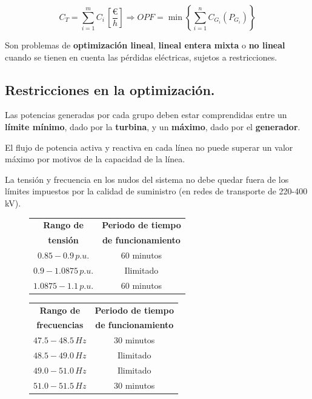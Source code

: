 			\[C_T = \sum_{i = 1}^m C_i\,\left[\dfrac{\euro}{h}\right] \Rightarrow 
			OPF = \min{ \left\{ \sum_{i = 1}^n C_{G_i} (P_{G_i}) \right\} } \]
			
			
			Son problemas de \textbf{optimización lineal}, \textbf{lineal entera mixta} o \textbf{no lineal} cuando se tienen en cuenta las pérdidas eléctricas, sujetos a restricciones. 
			
		\subsection{Restricciones en la optimización.}
			Las potencias generadas por cada grupo deben estar comprendidas entre un \textbf{límite mínimo}, dado por la \textbf{turbina}, y un \textbf{máximo}, dado por el \textbf{generador}.
			
			
			El flujo de potencia activa y reactiva en cada línea no puede superar un valor máximo por motivos de la capacidad de la línea.
			
			
			La tensión y frecuencia en los nudos del sistema no debe quedar fuera de los límites impuestos por la calidad de suministro (en redes de transporte de 220-400 kV).
			
			\begin{figure}
					\begin{minipage}{0.5\textwidth}
					\begin{table}[H]
						\centering
						\begin{tabular}{cc}
							\textbf{Rango de} & \textbf{Periodo de tiempo}\\
							\textbf{tensión} & \textbf{de funcionamiento}\\
							\hline
							$0.85-0.9\,p.u.$ & 60 minutos\\
							$0.9-1.0875\,p.u.$ & Ilimitado\\
							$1.0875-1.1\,p.u.$ & 60 minutos
						\end{tabular}
						\label{tab:tiemposCdt}
					\end{table}
				\end{minipage}
				\begin{minipage}{0.5\textwidth}
					\begin{table}[H]
						\centering
						\begin{tabular}{cc}
							\textbf{Rango de} & \textbf{Periodo de tiempo}\\
							\textbf{frecuencias} & \textbf{de funcionamiento}\\
							\hline
							$47.5-48.5\,Hz$ & 30 minutos\\
							$48.5-49.0\,Hz$ & Ilimitado\\
							$49.0-51.0\,Hz$ & Ilimitado\\
							$51.0-51.5\,Hz$ & 30 minutos
						\end{tabular}
						\label{tab:tiemposfrecuencias}
					\end{table}	
				\end{minipage}	
			\end{figure}	
			

